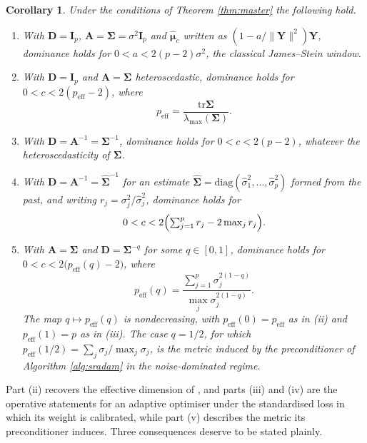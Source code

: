 \documentclass[a4paper,fleqn]{cas-dc}
\theoremstyle{plain}
\newtheorem{corollary}[theorem]{Corollary}
\theoremstyle{definition}
\theoremstyle{remark}
\newcommand{\rev}[1]{#1}
\newenvironment{revblock}{}{}
\newcommand{\peff}{p_{\mathrm{eff}}}
\newcommand{\peffq}[1]{p_{\mathrm{eff}}(#1)}
\newcommand{\tr}{\mathrm{tr}}
\newcommand{\diag}{\mathrm{diag}}
\begin{document}
\begin{corollary}
\label{cor:cases}
Under the conditions of Theorem \ref{thm:master} the following hold.
\begin{enumerate}
\item[(i)] With $\bm D=\bm I_p$, $\bm A=\bm\Sigma=\sigma^2\bm I_p$ and $\hat{\bm\mu}_c$ written as $(1-a/\|\bm Y\|^2)\bm Y$, dominance holds for $0<a<2(p-2)\sigma^2$, the classical James--Stein window.
\item[(ii)] With $\bm D=\bm I_p$ and $\bm A=\bm\Sigma$ heteroscedastic, dominance holds for $0<c<2(\peff-2)$, where
\begin{equation}
\peff=\frac{\tr\bm\Sigma}{\lambda_{\max}(\bm\Sigma)} .
\end{equation}
\item[(iii)] With $\bm D=\bm A^{-1}=\bm\Sigma^{-1}$, dominance holds for $0<c<2(p-2)$, whatever the heteroscedasticity of $\bm\Sigma$.
\item[(iv)] With $\bm D=\bm A^{-1}=\widehat{\bm\Sigma}^{-1}$ for an estimate $\widehat{\bm\Sigma}=\diag(\hat\sigma^2_1,\dots,\hat\sigma^2_p)$ formed from the past, and writing $r_j=\sigma^2_j/\hat\sigma^2_j$, dominance holds for
\begin{equation}
\label{eq:plugin_window}
0<c<2\Bigl(\textstyle\sum_{j=1}^{p}r_j-2\max_{j}r_j\Bigr) .
\end{equation}
\item[(v)] With $\bm A=\bm\Sigma$ and $\bm D=\bm\Sigma^{-q}$ for some $q\in[0,1]$, dominance holds for $0<c<2\bigl(\peffq{q}-2\bigr)$, where
\begin{equation}
\label{eq:peff_q}
\peffq{q}=\frac{\sum_{j=1}^{p}\sigma_j^{2(1-q)}}{\max_{j}\sigma_j^{2(1-q)}} .
\end{equation}
The map $q\mapsto\peffq{q}$ is nondecreasing, with $\peffq{0}=\peff$ as in (ii) and $\peffq{1}=p$ as in (iii). The case $q=1/2$, for which $\peffq{1/2}=\sum_j\sigma_j/\max_j\sigma_j$, is the metric induced by the preconditioner of Algorithm \ref{alg:sradam} in the noise-dominated regime.
\end{enumerate}
\end{corollary}

Part (ii) recovers the effective dimension of \citet{bock1975}, and parts (iii) and (iv) are the operative statements for an adaptive optimiser\rev{ under the standardised loss in which its weight is calibrated, while part (v) describes the metric its preconditioner induces}. Three consequences deserve to be stated plainly.
\end{document}
